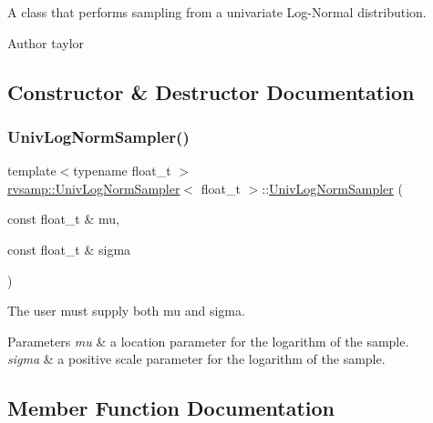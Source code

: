 A class that performs sampling from a univariate Log-\/\+Normal distribution. 

\begin{DoxyAuthor}{Author}
taylor 
\end{DoxyAuthor}


\subsection{Constructor \& Destructor Documentation}
\mbox{\label{classrvsamp_1_1UnivLogNormSampler_a679213457584e98a7dc205a9b7d6a0cd}} 
\subsubsection{\texorpdfstring{Univ\+Log\+Norm\+Sampler()}{UnivLogNormSampler()}}
{\footnotesize\ttfamily template$<$typename float\+\_\+t $>$ \\
\hyperlink{classrvsamp_1_1UnivLogNormSampler}{rvsamp\+::\+Univ\+Log\+Norm\+Sampler}$<$ float\+\_\+t $>$\+::\hyperlink{classrvsamp_1_1UnivLogNormSampler}{Univ\+Log\+Norm\+Sampler} (\begin{DoxyParamCaption}\item[{const float\+\_\+t \&}]{mu,  }\item[{const float\+\_\+t \&}]{sigma }\end{DoxyParamCaption})}



The user must supply both mu and sigma. 


\begin{DoxyParams}{Parameters}
{\em mu} & a location parameter for the logarithm of the sample. \\
\hline
{\em sigma} & a positive scale parameter for the logarithm of the sample. \\
\hline
\end{DoxyParams}


\subsection{Member Function Documentation}
\mbox{\label{classrvsamp_1_1UnivLogNormSampler_a816c87875ed08b4b90f9fbe3fd4bda88}} 
